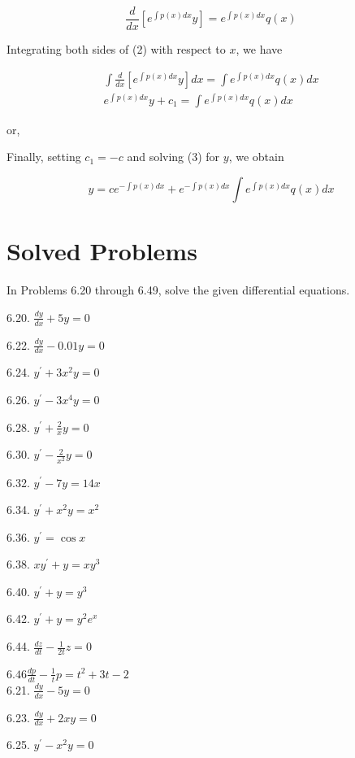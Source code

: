 \documentclass[10pt]{article}
\begin{document}
\begin{equation*}
\frac{d}{d x}\left[e^{\int p(x) d x} y\right]=e^{\int p(x) d x} q(x) \tag{2}
\end{equation*}


Integrating both sides of (2) with respect to $x$, we have


\begin{gather*}
\int \frac{d}{d x}\left[e^{\int p(x) d x} y\right] d x=\int e^{\int p(x) d x} q(x) d x \\
e^{\int p(x) d x} y+c_{1}=\int e^{\int p(x) d x} q(x) d x \tag{3}
\end{gather*}


or,

Finally, setting $c_{1}=-c$ and solving (3) for $y$, we obtain


\begin{equation*}
y=c e^{-\int p(x) d x}+e^{-\int p(x) d x} \int e^{\int p(x) d x} q(x) d x \tag{4}
\end{equation*}


\section*{Solved Problems}
In Problems 6.20 through 6.49, solve the given differential equations.

6.20. $\frac{d y}{d x}+5 y=0$

6.22. $\frac{d y}{d x}-0.01 y=0$

6.24. $y^{\prime}+3 x^{2} y=0$

6.26. $y^{\prime}-3 x^{4} y=0$

6.28. $y^{\prime}+\frac{2}{x} y=0$

6.30. $y^{\prime}-\frac{2}{x^{2}} y=0$

6.32. $y^{\prime}-7 y=14 x$

6.34. $y^{\prime}+x^{2} y=x^{2}$

6.36. $y^{\prime}=\cos x$

6.38. $x y^{\prime}+y=x y^{3}$

6.40. $y^{\prime}+y=y^{3}$

6.42. $y^{\prime}+y=y^{2} e^{x}$

6.44. $\frac{d z}{d t}-\frac{1}{2 t} z=0$

$6.46 \frac{d p}{d t}-\frac{1}{t} p=t^{2}+3 t-2$\\
6.21. $\frac{d y}{d x}-5 y=0$

6.23. $\frac{d y}{d x}+2 x y=0$

6.25. $y^{\prime}-x^{2} y=0$
\end{document}
